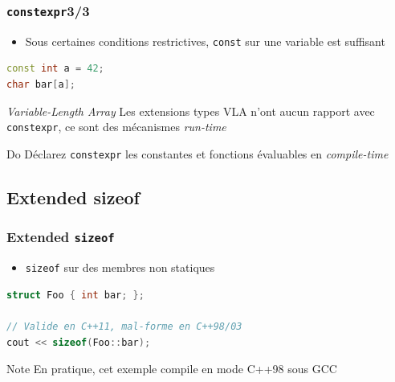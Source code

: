 \documentclass[C++.tex]{subfiles}
\begin{document}
\begin{frame}[fragile]
	\frametitle{\lstinline|constexpr|\titlehfill{}3/3}
	\begin{itemize}
		\item Sous certaines conditions restrictives, \lstinline|const| sur une variable est suffisant

	\end{itemize}

	\begin{lstlisting}[language=C++]
const int a = 42;
char bar[a];\end{lstlisting}

	\begin{alertblock}{\textit{Variable-Length Array}}
		Les extensions types VLA n'ont aucun rapport avec \lstinline|constexpr|, ce sont des mécanismes \textit{run-time}
	\end{alertblock}


	\begin{exampleblock}{Do}
		Déclarez \lstinline|constexpr| les constantes et fonctions évaluables en \textit{compile-time}
	\end{exampleblock}
\end{frame}

\subsection*{Extended sizeof}
\begin{frame}[fragile]
	\frametitle{Extended \lstinline|sizeof|}
	\begin{itemize}
		\item \lstinline|sizeof| sur des membres non statiques
	\end{itemize}

	\begin{lstlisting}[language=C++]
struct Foo { int bar; };

// Valide en C++11, mal-forme en C++98/03
cout << sizeof(Foo::bar); \end{lstlisting}


	\begin{block}{Note}
		En pratique, cet exemple compile en mode C++98 sous GCC

	\end{block}
\end{frame}
\end{document}
